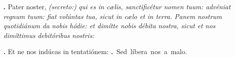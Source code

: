 \textbf{\Vbar.} Pater noster,
{\color{red} \textit{\small{(secreto:)}}}%
\textit{\small{ qui es in cælis, sanctificétur nomen tuum: advéniat regnum tuum: fiat volúntas tua, sicut in cælo et in terra. Panem nostrum quotidiánum da nobis hódie: et dimítte nobis débita nostra, sicut et nos dimíttimus debitóribus nostris:}}

\textbf{\Vbar.} Et ne nos indúcas in tentatiónem: 
\mbox{\textbf{\Rbar.} Sed líbera nos a malo.}






